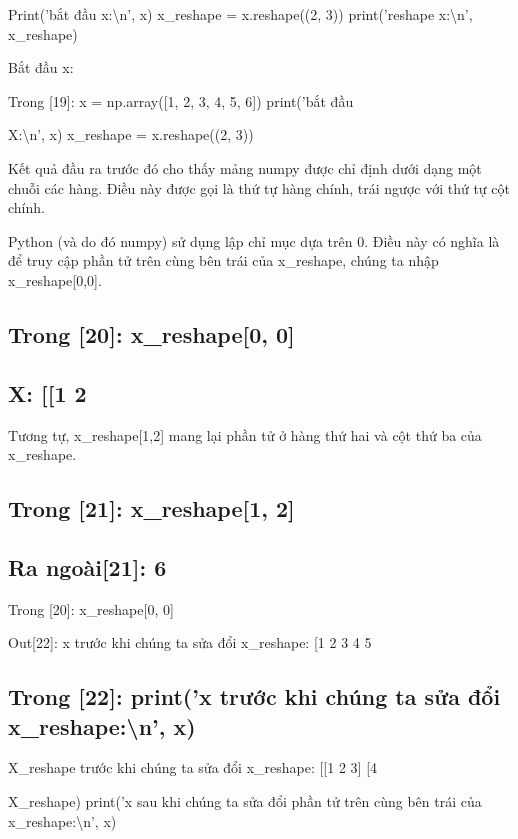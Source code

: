 Print('bắt đầu x:\textbackslash{}n', x) x\_reshape = x.reshape((2, 3)) print('reshape x:\textbackslash{}n', x\_reshape)

Bắt đầu x:

Trong [19]: x = np.array([1, 2, 3, 4, 5, 6]) print('bắt đầu

X:\textbackslash{}n', x) x\_reshape = x.reshape((2, 3))

Kết quả đầu ra trước đó cho thấy mảng numpy được chỉ định dưới dạng một chuỗi các hàng. Điều này được gọi là thứ tự hàng chính, trái ngược với thứ tự cột chính.

Python (và do đó numpy) sử dụng lập chỉ mục dựa trên 0. Điều này có nghĩa là để truy cập phần tử trên cùng bên trái của x\_reshape, chúng ta nhập x\_reshape[0,0].

\subsection{Trong [20]: x\_reshape[0, 0]}

\subsection{X: [[1 2}

Tương tự, x\_reshape[1,2] mang lại phần tử ở hàng thứ hai và cột thứ ba của x\_reshape.

\subsection{Trong [21]: x\_reshape[1, 2]}

\subsection{Ra ngoài[21]: 6}

Trong [20]: x\_reshape[0, 0]

Out[22]: x trước khi chúng ta sửa đổi x\_reshape: [1 2 3 4 5

\subsection{Trong [22]: print('x trước khi chúng ta sửa đổi x\_reshape:\textbackslash{}n', x)}

X\_reshape trước khi chúng ta sửa đổi x\_reshape: [[1 2 3] [4

X\_reshape) print('x sau khi chúng ta sửa đổi phần tử trên cùng bên trái của x\_reshape:\textbackslash{}n', x)

